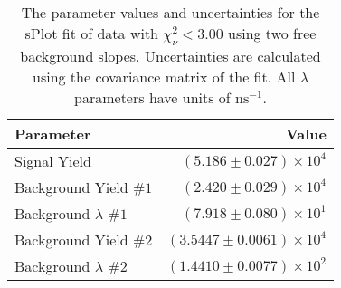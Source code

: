 
\begin{table}[h]
    \begin{center}
        \begin{tabular}{lr}\toprule
            Parameter & Value \\\midrule
            Signal Yield & $(5.186 \pm 0.027) \times 10^{4}$ \\
            Background Yield $\#1$ & $(2.420 \pm 0.029) \times 10^{4}$ \\
            Background $\lambda$ $\#1$ & $(7.918 \pm 0.080) \times 10^{1}$ \\
            Background Yield $\#2$ & $(3.5447 \pm 0.0061) \times 10^{4}$ \\
            Background $\lambda$ $\#2$ & $(1.4410 \pm 0.0077) \times 10^{2}$ \\\bottomrule
        \end{tabular}
        \caption{The parameter values and uncertainties for the sPlot fit of data with $\chi^2_\nu < 3.00$ using two free background slopes. Uncertainties are calculated using the covariance matrix of the fit. All $\lambda$ parameters have units of $\si{\nano\second}^{-1}$.}
    \end{center}
\end{table}
